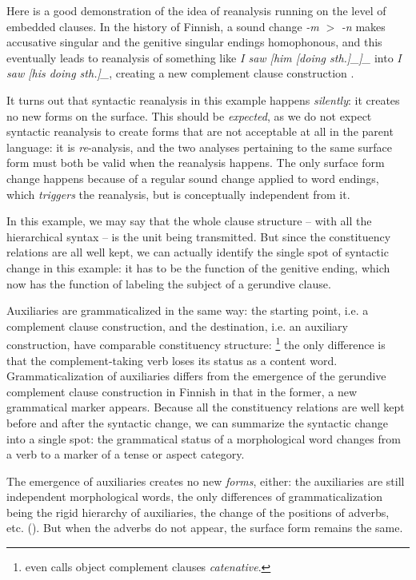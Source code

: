 \documentclass[a4paper, oneside, scheme=plain, 12pt]{article}
\newcommand*{\citepage}[1]{p.~{#1}}
\newcommand*{\citepages}[1]{pp.~{#1}}
\newcommand*{\term}[1]{\emph{#1}}
\newcommand{\form}[1]{\emph{#1}}
\newcommand*{\textgt}{$>$ }
\begin{document}
Here is a good demonstration of the idea of reanalysis running on the level of embedded clauses.
In the history of Finnish, a sound change \form{-m} \textgt \form{-n} makes accusative singular and the genitive singular endings homophonous,
and this eventually leads to reanalysis of something like \form{I saw [him [doing sth.]_{}]_{\text{object: noun phrase}}} into 
\form{I saw [his doing sth.]_{}},
creating a new complement clause construction
\citep[\citepages{275-276}]{campbell2013historical}.

It turns out that syntactic reanalysis in this example happens \emph{silently}:
it creates no new forms on the surface. 
This should be \emph{expected}, as we do not expect syntactic reanalysis to create forms 
that are not acceptable at all in the parent language:
it is \emph{re}-analysis, and the two analyses pertaining to the same surface form
must both be valid when the reanalysis happens.
The only surface form change happens because of a regular sound change applied to word endings,
which \emph{triggers} the reanalysis, but is conceptually independent from it.

In this example, we may say that the whole clause structure -- with all the hierarchical syntax -- is the unit being transmitted.
But since the constituency relations are all well kept,
we can actually identify the single spot of syntactic change in this example:
it has to be the function of the genitive ending,
which now has the function of labeling the subject of a gerundive clause.

Auxiliaries are grammaticalized in the same way:
the starting point, i.e. a complement clause construction,
and the destination, i.e. an auxiliary construction, have comparable constituency structure:%
\footnote{
    \citet[\citepage{65}]{cgel} even calls object complement clauses \term{catenative}. 
}
the only difference is that the complement-taking verb loses its status as a content word.
Grammaticalization of auxiliaries differs from the emergence of the gerundive complement clause construction in Finnish
in that in the former, a new grammatical marker appears.
Because all the constituency relations are well kept before and after the syntactic change,
we can summarize the syntactic change into a single spot:
the grammatical status of a morphological word changes
from a verb to a marker of a tense or aspect category.

The emergence of auxiliaries creates no new \emph{forms}, either:
the auxiliaries are still independent morphological words,
the only differences of grammaticalization being 
the rigid hierarchy of auxiliaries, the change of the positions of adverbs, etc. ().
But when the adverbs do not appear, the surface form remains the same.
\end{document}
